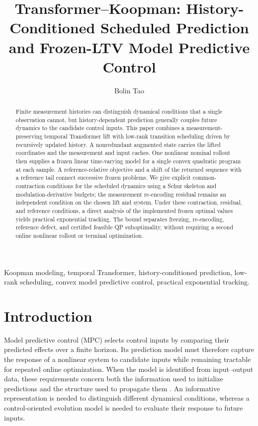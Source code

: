 \documentclass[journal]{IEEEtran}
\theoremstyle{plain}
\theoremstyle{definition}
\begin{document}
\title{Transformer--Koopman: History-Conditioned Scheduled Prediction and Frozen-LTV Model Predictive Control}
\author{Bolin Tao}
\maketitle

\begin{abstract}
Finite measurement histories can distinguish dynamical conditions that a single observation cannot, but history-dependent prediction generally couples future dynamics to the candidate control inputs. This paper combines a measurement-preserving temporal Transformer lift with low-rank transition scheduling driven by recursively updated history. A nonredundant augmented state carries the lifted coordinates and the measurement and input caches. One nonlinear nominal rollout then supplies a frozen linear time-varying model for a single convex quadratic program at each sample. A reference-relative objective and a shift of the returned sequence with a reference tail connect successive frozen problems. We give explicit common-contraction conditions for the scheduled dynamics using a Schur skeleton and modulation-derivative budgets; the measurement re-encoding residual remains an independent condition on the chosen lift and system. Under these contraction, residual, and reference conditions, a direct analysis of the implemented frozen optimal values yields practical exponential tracking. The bound separates freezing, re-encoding, reference defect, and certified feasible QP suboptimality, without requiring a second online nonlinear rollout or terminal optimization.
\end{abstract}
\begin{IEEEkeywords}
Koopman modeling, temporal Transformer, history-conditioned prediction, low-rank scheduling, convex model predictive control, practical exponential tracking.
\end{IEEEkeywords}

\section{Introduction}
\label{sec:introduction}
Model predictive control (MPC) selects control inputs by comparing their predicted effects over a finite horizon. Its prediction model must therefore capture the response of a nonlinear system to candidate inputs while remaining tractable for repeated online optimization. When the model is identified from input--output data, these requirements concern both the information used to initialize predictions and the structure used to propagate them \cite{ljung1999system,nelles2020nonlinear,forgione2021dynonet}. An informative representation is needed to distinguish different dynamical conditions, whereas a control-oriented evolution model is needed to evaluate their response to future inputs.
\end{document}
